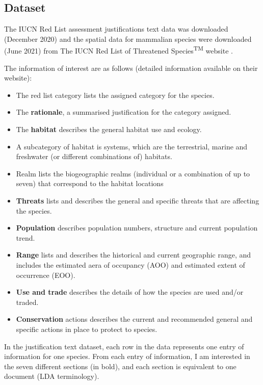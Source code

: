\subsection{Dataset}

The IUCN Red List assessment justifications text data was downloaded (December 2020) and the spatial data for mammalian species were downloaded (June 2021) from The IUCN Red List of Threatened Species\textsuperscript{TM} website \parencite{iucn2021}. 

The information of interest are as follows (detailed information available on their website):
\begin{itemize}
    \item The red list category lists the assigned category for the species. 
    \item The \textbf{rationale}, a summarised justification for the category assigned. 
    \item The \textbf{habitat} describes the general habitat use and ecology. 
    \item A subcategory of habitat is systems, which are the terrestrial, marine and freshwater (or different combinations of) habitats.
    \item Realm lists the biogeographic realms (individual or a combination of up to seven) that correspond to the habitat locations
    \item \textbf{Threats} lists and describes the general and specific threats that are affecting the species. 
    \item \textbf{Population} describes population numbers, structure and current population trend. 
    \item \textbf{Range} lists and describes the historical and current geographic range, and includes the estimated aera of occupancy (AOO) and estimated extent of occurrence (EOO). 
    \item \textbf{Use and trade} describes the details of how the species are used and/or traded.
    \item \textbf{Conservation} actions describes the current and recommended general and specific actions in place to protect to species. 
\end{itemize}

In the justification text dataset, each row in the data represents one entry of information for one species. From each entry of information, I am interested in the seven different sections (in bold), and each section is equivalent to one document (LDA terminology).

